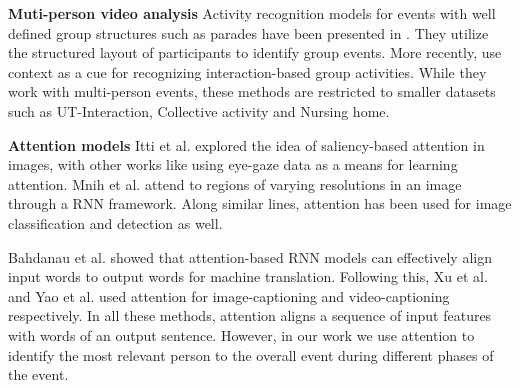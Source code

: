 
\noindent \textbf{Muti-person video analysis}
Activity recognition models for events with well defined group structures such
as parades have been presented in
\cite{Vaswani_CVPR03,Intille_CVIU01,Moore_AAAI02,Khan_ACM05}.  They utilize the
structured layout of participants to identify group events. More
recently, \cite{Lan_PAMI12,Choi_ICCV09,Khodabandeh_arxiv15} use context as a
cue for recognizing interaction-based group activities.  While they work with 
multi-person events, these methods are restricted to smaller
datasets such as UT-Interaction\cite{Ryoo_10}, Collective activity
\cite{Choi_ICCV09} and Nursing home\cite{Lan_PAMI12}.

\noindent \textbf{Attention models}
Itti et al. \cite{Itti_PAMI98} explored the idea of saliency-based attention in
images, with other works like \cite{Shapovalova_NIPS13} using eye-gaze data as
a means for learning attention.  Mnih et al. \cite{Mnih_NIPS14} attend to
regions of varying resolutions in an image through a RNN framework.  Along
similar lines, attention has been used for image classification
\cite{Cao_ICCV15,Gregor_arxiv15,Xiao_arxiv14} and detection
\cite{Ba_arxiv14,Caicedo_ICCV15,Yoo_arxiv15} as well.

Bahdanau et al. \cite{Bahdnau_arxiv14} showed that attention-based RNN models
can effectively align input words to output words for machine translation.
Following this, Xu et al. \cite{Xu_arxiv15} and Yao et al. \cite{Yao_arxiv15}
used attention for image-captioning and video-captioning respectively.
 In all these methods,
attention aligns a sequence of input features with words of an output sentence.
However, in our work we use attention to identify the most relevant person to
the overall event during different phases of the event.

